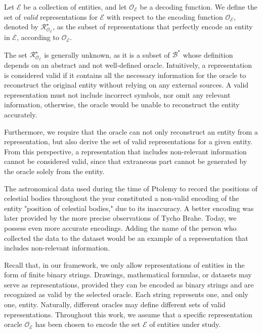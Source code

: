\begin{definition}
Let $\mathcal{E}$ be a collection of entities, and let $\mathcal{O}_\mathcal{E}$ be a decoding function. We define the set of \emph{valid} representations for $\mathcal{E}$ with respect to the encoding function $\mathcal{O}_\mathcal{E}$, denoted by $\mathcal{R}^\star_{\mathcal{O}_\mathcal{E}}$, as the subset of representations that perfectly encode an entity in $\mathcal{E}$, according to $\mathcal{O}_\mathcal{E}$.
\end{definition}

The set $\mathcal{R}^\star_{\mathcal{O}_\mathcal{E}}$ is generally unknown, as it is a subset of $\mathcal{B}^\ast$ whose definition depends on an abstract and not well-defined oracle. Intuitively, a representation is considered valid if it contains all the necessary information for the oracle to reconstruct the original entity without relying on any external sources. A valid representation must not include incorrect symbols, nor omit any relevant information, otherwise, the oracle would be unable to reconstruct the entity accurately.

Furthermore, we require that the oracle can not only reconstruct an entity from a representation, but also derive the set of valid representations for a given entity. From this perspective, a representation that includes non-relevant information cannot be considered valid, since that extraneous part cannot be generated by the oracle solely from the entity.

\begin{example}
The astronomical data used during the time of Ptolemy to record the positions of celestial bodies throughout the year constituted a non-valid encoding of the entity "position of celestial bodies," due to its inaccuracy. A better encoding was later provided by the more precise observations of Tycho Brahe. Today, we possess even more accurate encodings. Adding the name of the person who collected the data to the dataset would be an example of a representation that includes non-relevant information.
\end{example}

Recall that, in our framework, we only allow representations of entities in the form of finite binary strings. Drawings, mathematical formulas, or datasets may serve as representations, provided they can be encoded as binary strings and are recognized as valid by the selected oracle. Each string represents one, and only one, entity. Naturally, different oracles may define different sets of valid representations. Throughout this work, we assume that a specific representation oracle $\mathcal{O}_\mathcal{E}$ has been chosen to encode the set $\mathcal{E}$ of entities under study.

